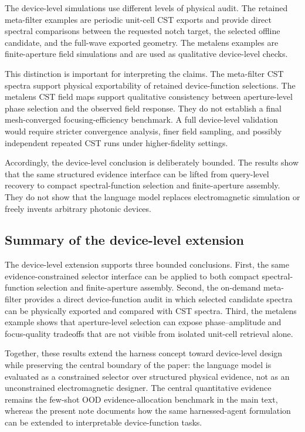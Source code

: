 \documentclass[final,1p,times]{elsarticle}
\begin{document}
The device-level simulations use different levels of physical audit. The retained meta-filter examples are periodic unit-cell CST exports and provide direct spectral comparisons between the requested notch target, the selected offline candidate, and the full-wave exported geometry. The metalens examples are finite-aperture field simulations and are used as qualitative device-level checks.

This distinction is important for interpreting the claims. The meta-filter CST spectra support physical exportability of retained device-function selections. The metalens CST field maps support qualitative consistency between aperture-level phase selection and the observed field response. They do not establish a final mesh-converged focusing-efficiency benchmark. A full device-level validation would require stricter convergence analysis, finer field sampling, and possibly independent repeated CST runs under higher-fidelity settings.

Accordingly, the device-level conclusion is deliberately bounded. The results show that the same structured evidence interface can be lifted from query-level recovery to compact spectral-function selection and finite-aperture assembly. They do not show that the language model replaces electromagnetic simulation or freely invents arbitrary photonic devices.

\subsection{Summary of the device-level extension}

The device-level extension supports three bounded conclusions. First, the same evidence-constrained selector interface can be applied to both compact spectral-function selection and finite-aperture assembly. Second, the on-demand meta-filter provides a direct device-function audit in which selected candidate spectra can be physically exported and compared with CST spectra. Third, the metalens example shows that aperture-level selection can expose phase--amplitude and focus-quality tradeoffs that are not visible from isolated unit-cell retrieval alone.

Together, these results extend the harness concept toward device-level design while preserving the central boundary of the paper: the language model is evaluated as a constrained selector over structured physical evidence, not as an unconstrained electromagnetic designer. The central quantitative evidence remains the few-shot OOD evidence-allocation benchmark in the main text, whereas the present note documents how the same harnessed-agent formulation can be extended to interpretable device-function tasks.
\end{document}
